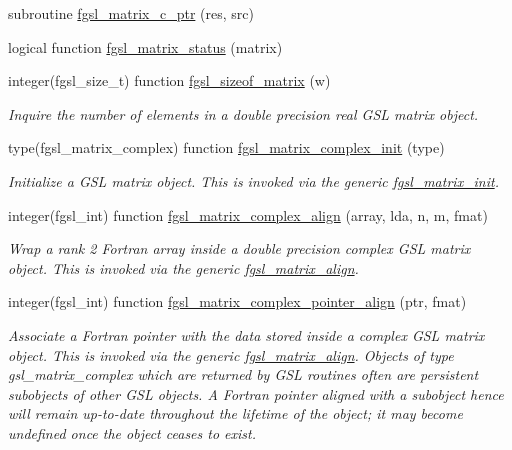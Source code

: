 \begin{DoxyCompactItemize}
subroutine \hyperlink{array_8finc_ae039428ac81fb123a5223c7676b1b687}{fgsl\+\_\+matrix\+\_\+c\+\_\+ptr} (res, src)
\item 
logical function \hyperlink{array_8finc_a5d41e00e4a2ec9c3b0594ec77ff02c5e}{fgsl\+\_\+matrix\+\_\+status} (matrix)
\item 
integer(fgsl\+\_\+size\+\_\+t) function \hyperlink{array_8finc_addcfbdff17fa7ce904b853ed793bb1d9}{fgsl\+\_\+sizeof\+\_\+matrix} (w)
\begin{DoxyCompactList}\small\item\em Inquire the number of elements in a double precision real G\+S\+L matrix object. \end{DoxyCompactList}\item 
type(fgsl\+\_\+matrix\+\_\+complex) function \hyperlink{array_8finc_af7461bad6c35fe6dde17e9c06bbc5cd0}{fgsl\+\_\+matrix\+\_\+complex\+\_\+init} (type)
\begin{DoxyCompactList}\small\item\em Initialize a G\+S\+L matrix object. This is invoked via the generic \hyperlink{interfacefgsl__matrix__init}{fgsl\+\_\+matrix\+\_\+init}. \end{DoxyCompactList}\item 
integer(fgsl\+\_\+int) function \hyperlink{array_8finc_ada029e69fd21da1d81472a285f1269a2}{fgsl\+\_\+matrix\+\_\+complex\+\_\+align} (array, lda, n, m, fmat)
\begin{DoxyCompactList}\small\item\em Wrap a rank 2 Fortran array inside a double precision complex G\+S\+L matrix object. This is invoked via the generic \hyperlink{interfacefgsl__matrix__align}{fgsl\+\_\+matrix\+\_\+align}. \end{DoxyCompactList}\item 
integer(fgsl\+\_\+int) function \hyperlink{array_8finc_a000f8ca7f88b4dfb7a5cc700ccf3b868}{fgsl\+\_\+matrix\+\_\+complex\+\_\+pointer\+\_\+align} (ptr, fmat)
\begin{DoxyCompactList}\small\item\em Associate a Fortran pointer with the data stored inside a complex G\+S\+L matrix object. This is invoked via the generic \hyperlink{interfacefgsl__matrix__align}{fgsl\+\_\+matrix\+\_\+align}. Objects of type {\ttfamily gsl\+\_\+matrix\+\_\+complex} which are returned by G\+S\+L routines often are persistent subobjects of other G\+S\+L objects. A Fortran pointer aligned with a subobject hence will remain up-\/to-\/date throughout the lifetime of the object; it may become undefined once the object ceases to exist. \end{DoxyCompactList}\item 

\end{DoxyCompactItemize}
